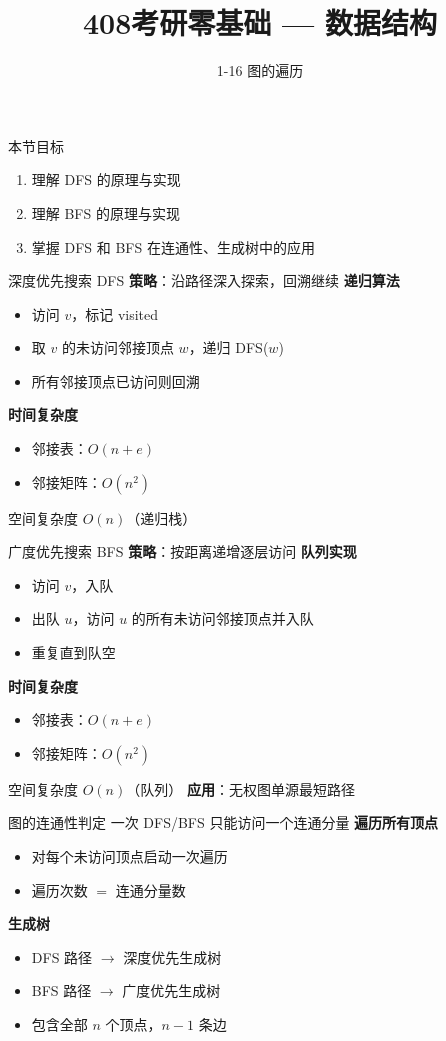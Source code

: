 \documentclass[10pt, aspectratio=169]{beamer}
\title{408考研零基础 --- 数据结构}
\subtitle{1-16 图的遍历}
\author{}
\date{}
\begin{document}
\begin{frame}{本节目标}
\begin{enumerate}
\item 理解 DFS 的原理与实现
\item 理解 BFS 的原理与实现
\item 掌握 DFS 和 BFS 在连通性、生成树中的应用
\end{enumerate}
\end{frame}
\begin{frame}{深度优先搜索 DFS}
\textbf{策略}：沿路径深入探索，回溯继续
\vspace{0.3em}
\textbf{递归算法}
\begin{itemize}
\item 访问 $v$，标记 visited
\item 取 $v$ 的未访问邻接顶点 $w$，递归 DFS($w$)
\item 所有邻接顶点已访问则回溯
\end{itemize}
\vspace{0.3em}
\textbf{时间复杂度}
\begin{itemize}
\item 邻接表：$O(n+e)$
\item 邻接矩阵：$O(n^2)$
\end{itemize}
空间复杂度 $O(n)$（递归栈）
\end{frame}
\begin{frame}{广度优先搜索 BFS}
\textbf{策略}：按距离递增逐层访问
\vspace{0.3em}
\textbf{队列实现}
\begin{itemize}
\item 访问 $v$，入队
\item 出队 $u$，访问 $u$ 的所有未访问邻接顶点并入队
\item 重复直到队空
\end{itemize}
\vspace{0.3em}
\textbf{时间复杂度}
\begin{itemize}
\item 邻接表：$O(n+e)$
\item 邻接矩阵：$O(n^2)$
\end{itemize}
空间复杂度 $O(n)$（队列）
\vspace{0.3em}
\textbf{应用}：无权图单源最短路径
\end{frame}
\begin{frame}{图的连通性判定}
一次 DFS/BFS 只能访问一个连通分量
\vspace{0.3em}
\textbf{遍历所有顶点}
\begin{itemize}
\item 对每个未访问顶点启动一次遍历
\item 遍历次数 $=$ 连通分量数
\end{itemize}
\vspace{0.5em}
\textbf{生成树}
\begin{itemize}
\item DFS 路径 $\to$ 深度优先生成树
\item BFS 路径 $\to$ 广度优先生成树
\item 包含全部 $n$ 个顶点，$n-1$ 条边
\end{itemize}
\end{frame}
\end{document}
